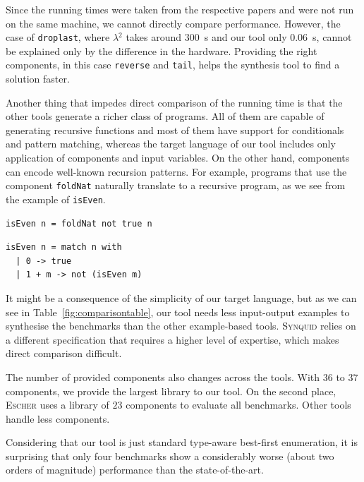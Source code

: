 Since the running times were taken from the respective papers and were not run on the same machine, we cannot directly compare performance. However, the case of \lstinline?droplast?, where \textsc{$\lambda^2$} takes around \SI{300}{s} and our tool only \SI{0.06}{s}, cannot be explained only by the difference in the hardware. Providing the right components, in this case \lstinline?reverse? and \lstinline?tail?, helps the synthesis tool to find a solution faster.

Another thing that impedes direct comparison of the running time is that the other tools generate a richer class of programs. All of them are capable of generating recursive functions and most of them have support for conditionals and pattern matching, whereas the target language of our tool includes only application of components and input variables. On the other hand, components can encode well-known recursion patterns. For example, programs that use the component \lstinline?foldNat? naturally translate to a recursive program, as we see from the example of \lstinline?isEven?.
\begin{lstlisting}[style=plain]
isEven n = foldNat not true n
\end{lstlisting}
\begin{lstlisting}[style=plain]
isEven n = match n with
  | 0 -> true
  | 1 + m -> not (isEven m)
\end{lstlisting}

It might be a consequence of the simplicity of our target language, but as we can see in Table~\ref{fig:comparisontable}, our tool needs less input-output examples to synthesise the benchmarks than the other example-based tools. \textsc{Synquid} relies on a different specification that requires a higher level of expertise, which makes direct comparison difficult.

The number of provided components also changes across the tools. With $36$ to $37$ components, we provide the largest library to our tool. On the second place, \textsc{Escher} uses a library of $23$ components to evaluate all benchmarks. Other tools handle less components.

Considering that our tool is just standard type-aware best-first enumeration, it is surprising that only four benchmarks show a considerably worse (about two orders of magnitude) performance than the state-of-the-art.


